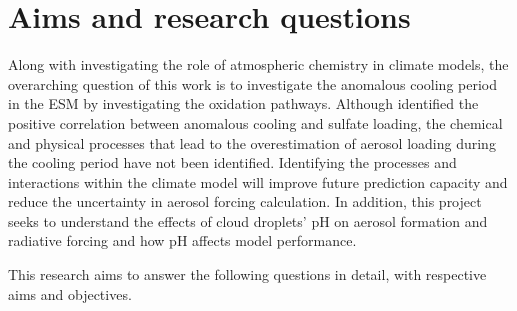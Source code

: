 \section{Aims and research questions}

Along with investigating the role of atmospheric chemistry in climate models, the overarching question of this work is to investigate the anomalous cooling period in the ESM by investigating the  oxidation pathways. Although \citet{zhangRoleAnthropogenicAerosols2021} identified the positive correlation between anomalous cooling and sulfate loading, the chemical and physical processes that lead to the overestimation of aerosol loading during the cooling period have not been identified. Identifying the processes and interactions within the climate model will improve future prediction capacity and reduce the uncertainty in aerosol forcing calculation. In addition, this project seeks to understand the effects of cloud droplets' pH on aerosol formation and radiative forcing and how pH affects model performance. 

This research aims to answer the following questions in detail, with respective aims and objectives.

